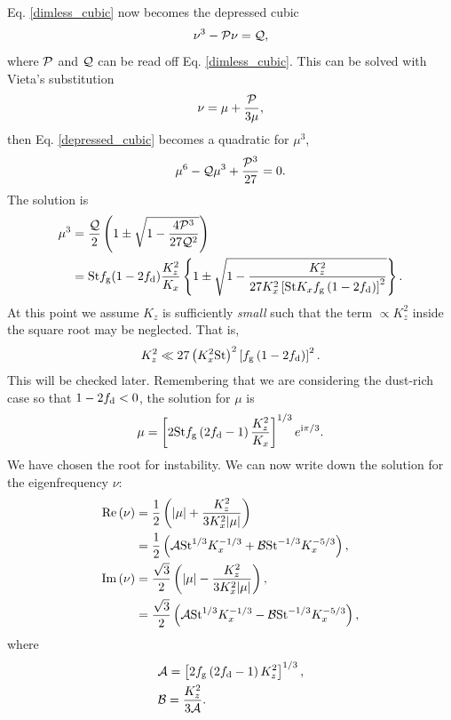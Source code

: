 Eq. \ref{dimless_cubic} now becomes the depressed cubic 
\begin{align}
  \nu^3 - \mathcal{P} \nu = \mathcal{Q}, \label{depressed_cubic}
\end{align}
where $\mathcal{P}$ and $\mathcal{Q}$ can be read off Eq. \ref{dimless_cubic}. This can be
solved with Vieta's substitution 
\begin{align*}
\nu = \mu + \frac{\mathcal{P}}{3\mu},
\end{align*}
then Eq. \ref{depressed_cubic} becomes a quadratic for $\mu^3$,
\begin{align}
\mu^6 - \mathcal{Q}\mu^3 + \frac{\mathcal{P}^3}{27} = 0. 
\end{align}
The solution is
\begin{align}
  \mu^3 &= \frac{\mathcal{Q}}{2}\left(1\pm \sqrt{1 -
      \frac{4\mathcal{P}^3}{27\mathcal{Q}^2}}\right)\notag\\
  & = \mathrm{St} f_\mathrm{g} (1- 2f_\mathrm{d})\frac{K_z^2}{K_x}\left\{1 \pm \sqrt{1 -
      \frac{K_z^2}{27K_x^2\left[\mathrm{St} K_x f_\mathrm{g}
          \left(1-2f_\mathrm{d}\right)\right]^2}}\right\}.  
\end{align}
At this point we assume $K_z$ is sufficiently \emph{small} such that
the term $\propto K_z^2$ inside the square root may be neglected. That
is, 
\begin{align}
  K_z^2 \ll 27 \left(K_x^2\mathrm{St}\right)^2 \left[f_\mathrm{g}
          \left(1-2f_\mathrm{d}\right)\right]^2. \label{max_kz}
\end{align}
This will be checked later. Remembering that we are considering the
dust-rich case so that $1-2f_\mathrm{d}<0$, the solution for $\mu$ is   
\begin{align}
\mu = \left[2\mathrm{St}f_\mathrm{g} \left(2f_\mathrm{d}
    -1\right)\frac{K_z^2}{K_x}\right]^{1/3}e^{\mathrm{i}\pi/3}. \label{mu_explicit} 
\end{align}
We have chosen the root for instability. We can now write down the
solution for the eigenfrequency $\nu$:
\begin{align}
\operatorname{Re}{(\nu)} &= \frac{1}{2}\left(|\mu| + \frac{K_z^2}{3
    K_x^2|\mu|}\right)\notag\\
&= \frac{1}{2}\left(\mathcal{A} \mathrm{St}^{1/3}K_x^{-1/3} + \mathcal{B}
    \mathrm{St}^{-1/3}K_x^{-5/3}\right),\\
\operatorname{Im}{(\nu)} &= \frac{\sqrt{3}}{2}\left(|\mu| - \frac{K_z^2}{3
    K_x^2|\mu|}\right),\notag\\
&= \frac{\sqrt{3}}{2}\left(\mathcal{A} \mathrm{St}^{1/3}K_x^{-1/3} - \mathcal{B}
    \mathrm{St}^{-1/3}K_x^{-5/3}\right),
\end{align}
where
\begin{align}
  &\mathcal{A} = \left[2f_\mathrm{g} \left(2f_\mathrm{d}
      -1\right)K_z^2\right]^{1/3} ,\\
  &\mathcal{B} = \frac{K_z^2}{3\mathcal{A}}. 
\end{align}


